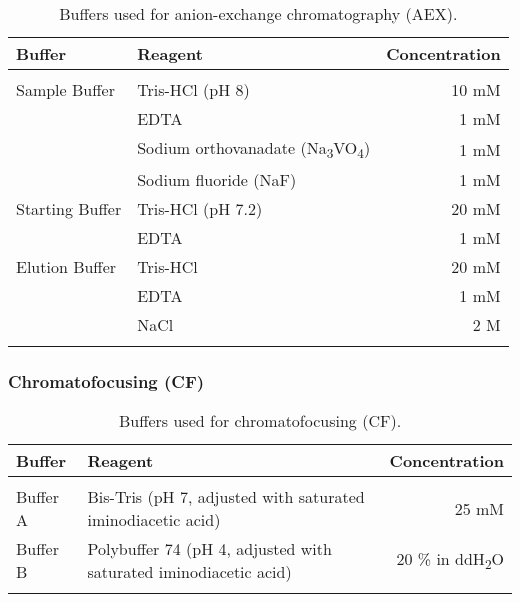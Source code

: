 \begin{center}
\begin{table}[H]
\begin{tabular}{l l r}
\textbf{Buffer} & \textbf{Reagent} & \textbf{Concentration}\\
\hline
\\
Sample Buffer & Tris-HCl (pH 8) & 10 mM\\
& EDTA & 1 mM\\
& Sodium orthovanadate (Na\textsubscript{3}VO\textsubscript{4}) & 1 mM\\
& Sodium fluoride (NaF) & 1 mM\\

Starting Buffer & Tris-HCl (pH 7.2) & 20 mM\\
& EDTA & 1 mM\\

Elution Buffer & Tris-HCl & 20 mM\\
& EDTA & 1 mM\\
& NaCl & 2 M\\ 
\\
\end{tabular}
\caption[Anion-exchange chromatography (AEX) buffers]{Buffers used for anion-exchange chromatography (AEX).}
\label{AEX buffers}
\end{table}

\end{center}


\subsubsection{Chromatofocusing (CF)}

\begin{center}
\begin{table}[H]
\begin{tabular}{l l r}
\textbf{Buffer} & \textbf{Reagent} & \textbf{Concentration}\\
\hline
\\
Buffer A & Bis-Tris (pH 7, adjusted with saturated iminodiacetic acid) & 25 mM\\
Buffer B & Polybuffer 74 (pH 4, adjusted with saturated iminodiacetic acid) & 20 \% in ddH\textsubscript{2}O\\
\\
\end{tabular}
\caption[Chromatofocusing (CF) buffers]{Buffers used for chromatofocusing (CF).}
\label{CF buffers}
\end{table}

\end{center}

